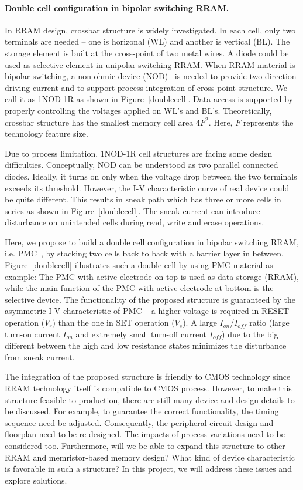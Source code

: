 \paragraph{Double cell configuration in bipolar switching RRAM.}
In RRAM design, crossbar structure is widely investigated. In each cell, only two terminals are needed -- one is horizonal (WL) and another is vertical (BL). The storage element is built at the cross-point of two metal wires. A diode could be used as selective element in unipolar switching RRAM. When RRAM material is bipolar switching, a non-ohmic device (NOD)~\cite{Yan4430255} is needed to provide two-direction driving current and to support process integration of cross-point structure. We call it as 1NOD-1R as shown in Figure~\ref{doublecell}. Data access is supported by properly controlling the voltages applied on WL's and BL's. Theoretically, crossbar structure has the smallest memory cell area 4$F^2$. Here, $F$ represents the technology feature size.

Due to process limitation, 1NOD-1R cell structures are facing some design difficulties. Conceptually, NOD can be understood as two parallel connected diodes. Ideally, it turns on only when the voltage drop between the two terminals exceeds its threshold. However, the I-V characteristic curve of real device could be quite different. This results in sneak path which has three or more cells in series as shown in Figure~\ref{doublecell}. The sneak current can introduce disturbance on unintended cells during read, write and erase operations.

Here, we propose to build a double cell configuration in bipolar switching RRAM, i.e. PMC~\cite{Kozicki05}, by stacking two cells back to back with a barrier layer in between. Figure~\ref{doublecell} illustrates such a double cell by using PMC material as example: The PMC with active electrode on top is used as data storage (RRAM), while the main function of the PMC with active electrode at bottom is the selective device. The functionality of the proposed structure is guaranteed by the asymmetric I-V characteristic of PMC -- a higher voltage is required in RESET operation ($V_r$) than the one in SET operation ($V_s$). A large $I_{on}$/$I_{off}$ ratio (large turn-on current $I_{on}$ and extremely small turn-off current $I_{off}$) due to the big different between the high and low resistance states minimizes the disturbance from sneak current. 

The integration of the proposed structure is friendly to CMOS technology since RRAM technology itself is compatible to CMOS process. However, to make this structure feasible to production, there are still many device and design details to be discussed. For example, to guarantee the correct functionality, the timing sequence need be adjusted. Consequently, the peripheral circuit design and floorplan need to be re-designed. The impacts of process variations need to be considered too. Furthermore, will we be able to expand this structure to other RRAM and memristor-based memory design? What kind of device characteristic is favorable in such a structure? In this project, we will address these issues and explore solutions.

